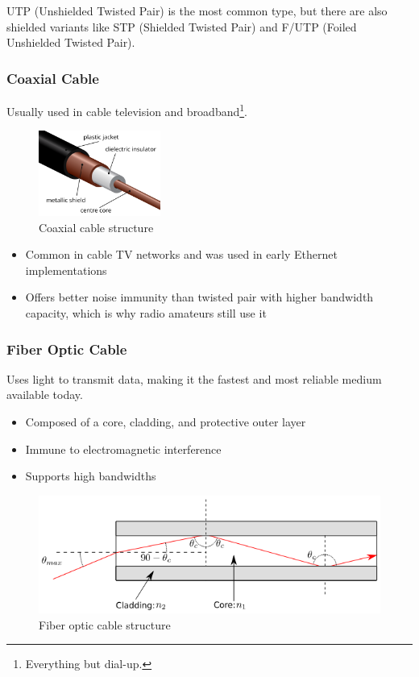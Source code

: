 UTP (Unshielded Twisted Pair) is the most common type, but there are also shielded variants like STP (Shielded Twisted Pair) and F/UTP (Foiled Unshielded Twisted Pair).

\vspace{1em}

\subsubsection*{Coaxial Cable}
Usually used in cable television and broadband\footnote{Everything but dial-up.}.

\begin{figure}[h]
    \centering
    \includegraphics[width=4cm]{assets/osi/physical/coax.png}
    \caption{Coaxial cable structure}\label{fig:coaxial_cable}
\end{figure}

\begin{itemize}
    \item Common in cable TV networks and was used in early Ethernet implementations
    \item Offers better noise immunity than twisted pair with higher bandwidth capacity, which is why radio amateurs still use it
\end{itemize}

\vspace{1em}

\subsubsection*{Fiber Optic Cable}
Uses light to transmit data, making it the fastest and most reliable medium available today.

\begin{itemize}
    \item Composed of a core, cladding, and protective outer layer
    \item Immune to electromagnetic interference
    \item Supports high bandwidths
\end{itemize}

\begin{figure}
    \centering
    \includegraphics[width=.8\textwidth]{assets/osi/physical/fiber.png}
    \caption{Fiber optic cable structure}\label{fig:fiber_optic}
\end{figure}

